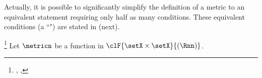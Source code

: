 Actually, it is possible to significantly simplify the definition of a metric
to an equivalent statement requiring only half as many conditions.
These equivalent conditions (a ``") are stated in  (next).
\begin{theorem}
\label{thm:metric_equiv}
\footnote{
  ,
  ,
  }
Let $\metricn$ be a function in $\clF{\setX\times\setX}{(\Rnn)}$.
\end{theorem}
